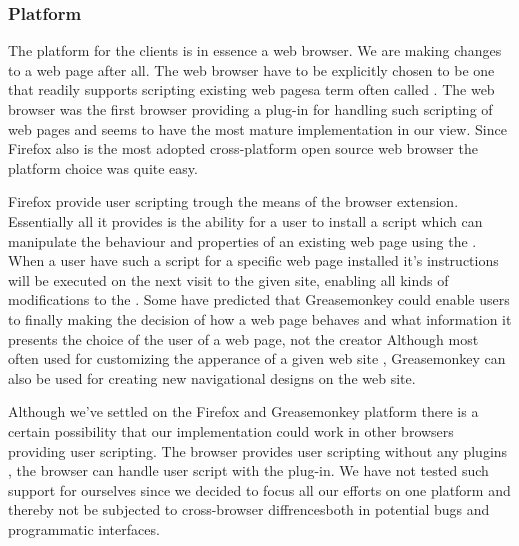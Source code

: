 \subsubsection{Platform}
\label{section:implementation.architecture.client.side.platform}

The platform for the clients is in essence a web browser. We are making
changes to a web page after all. The web browser have to be explicitly chosen
to be one that readily supports scripting existing
web pages\dash{}a term often called .
The %
web browser was the first browser providing a
plug-in for handling such scripting of web pages and seems to have the most
mature implementation in our view. Since Firefox also is the
most adopted%
cross-platform open source web browser the platform choice was quite easy.

Firefox provide user scripting trough the means of the
%
browser extension. Essentially all it provides is the ability for a user to
install a script which can manipulate the behaviour and properties of an
existing web page using the %
.
When a user have such a script for a specific web page installed it's
instructions will be executed on the next visit to the given site, enabling
all kinds of modifications to the .
Some have predicted that Greasemonkey could enable users to
finally \dash{}making the decision of how a web page
behaves and what information it presents the choice of the user of a web page,
not the creator \citep[pp.~3--4.]{filman06}
Although most often used
for customizing the apperance of a given web site \citep[p.~39]{vitali06},
Greasemonkey can also be used for creating new navigational designs on the
\urort{} web site.

Although we've settled on the Firefox and Greasemonkey platform there is a
certain possibility that our implementation could work in other browsers
providing user scripting. The  browser provides user scripting
without any plugins%
,
the  browser can handle user script with the
%
plug-in. We have not tested such support for ourselves since we decided to
focus all our efforts on one platform and thereby not be subjected to
cross-browser diffrences\dash{}both in potential bugs and programmatic
interfaces.

